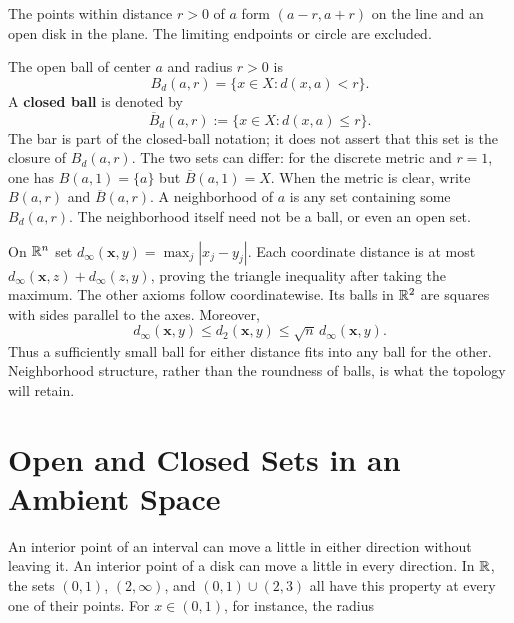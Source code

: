 The points within distance $r>0$ of $a$ form $(a-r,a+r)$ on the line
and an open disk in the plane. The limiting endpoints or circle are excluded.
\begin{center}
\end{center}
\begin{definition}
The open ball of center $a$ and radius $r>0$ is
\[
B_d(a,r)=\{x\in X:d(x,a)<r\}.
\]
A \textbf{closed ball} is denoted by
\[
\overline B_d(a,r):=\{x\in X:d(x,a)\leq r\}.
\]
The bar is part of the closed-ball notation; it does not assert that this
set is the closure of $B_d(a,r)$. The two sets can differ: for the discrete
metric and $r=1$, one has $B(a,1)=\{a\}$ but $\overline B(a,1)=X$.
When the metric is clear, write
$B(a,r)$ and $\overline B(a,r)$.
A neighborhood of $a$ is any set containing some $B_d(a,r)$.
The neighborhood itself need not be a ball, or even an open set.
\end{definition}
\begin{example}
On $\mathbb{R}^n$ set $d_\infty(\mathbf{x},y)=\max_j|x_j-y_j|$. Each coordinate
distance is at most $d_\infty(\mathbf{x},z)+d_\infty(z,y)$, proving the triangle
inequality after taking the maximum. The other axioms follow coordinatewise.
Its balls in $\mathbb{R}^2$ are squares with sides parallel to the axes. Moreover,
\[
d_\infty(\mathbf{x},y)\leq d_2(\mathbf{x},y)\leq\sqrt n\,d_\infty(\mathbf{x},y).
\]
Thus a sufficiently small ball for either distance fits into any ball for
the other. Neighborhood structure, rather than the roundness of balls, is
what the topology will retain.
\end{example}

\section{Open and Closed Sets in an Ambient Space}
An interior point of an interval can move a little in either direction
without leaving it. An interior point of a disk can move a little in every
direction. In $\mathbb{R}$, the sets $(0,1)$, $(2,\infty)$, and
$(0,1)\cup(2,3)$ all have this property at every one of their points.
For $x\in(0,1)$, for instance, the radius

